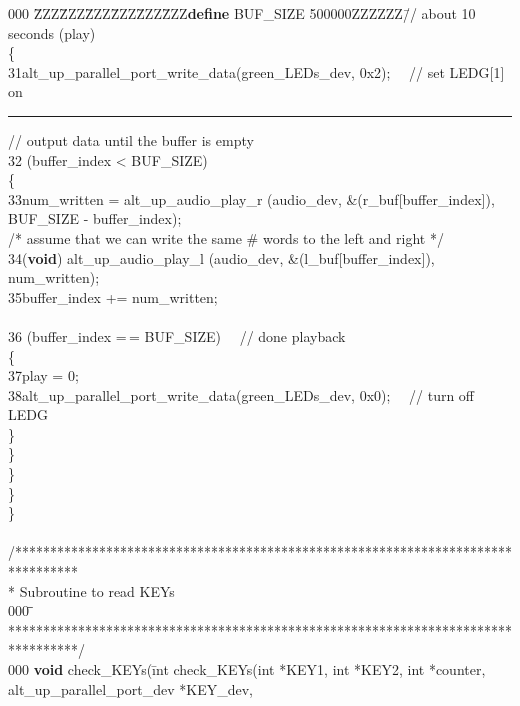 \documentclass[11pt, twoside, pdftex]{article}
\begin{document}
\clearpage

\begin{table}
\begin{center}
\begin{minipage}[t]{12.5 cm}
\begin{tabbing}
000 \=ZZZ\=ZZZ\=ZZZ\=ZZZ\=ZZZ\=ZZZ\={\bf define} BUF\_SIZE 500000ZZZZZZ\=// about 10 seconds \>\> (play)\\
\>\>\>\{\\
31\>\>\>\>alt\_up\_parallel\_port\_write\_data(green\_LEDs\_dev, 0x2); ~~// set LEDG[1] on\\
\rule{6.0in}{0in} 
\>\>\>\>// output data until the buffer is empty \\
32\>\>\> (buffer\_index < BUF\_SIZE)\\
\>\>\>\>\{\\
33\>\>\>\>\>num\_written = alt\_up\_audio\_play\_r (audio\_dev, \&(r\_buf[buffer\_index]), \\
\>\>\>\>\>\>BUF\_SIZE - buffer\_index);\\
\>\>\>\>\>/* assume that we can write the same \# words to the left and right */\\
34\>\>\>\>\>({\bf void}) alt\_up\_audio\_play\_l (audio\_dev, \&(l\_buf[buffer\_index]), num\_written);\\
35\>\>\>\>\>buffer\_index += num\_written;\\
\\
36\>\>\>\> (buffer\_index =$\,$= BUF\_SIZE) ~~// done playback\\
\>\>\>\>\>\{\\
37\>\>\>\>\>\>play = 0;\\
38\>\>\>\>\>\>alt\_up\_parallel\_port\_write\_data(green\_LEDs\_dev, 0x0); ~~// turn off LEDG\\
\>\>\>\>\>\}\\
\>\>\>\>\}\\
\>\>\>\}\\
\>\>\}\\
\>\}\\
\\
\>/*********************************************************************************\\
\>\>* Subroutine to read KEYs\\
000 \=\=\kill
\>**********************************************************************************/\\
000 \={\bf void} check\_KEYs(\=int  check\_KEYs(int *KEY1, int *KEY2, int *counter, alt\_up\_parallel\_port\_dev *KEY\_dev,\\

\end{tabbing}
\end{minipage}
\end{center}
\end{table}
\end{document}
